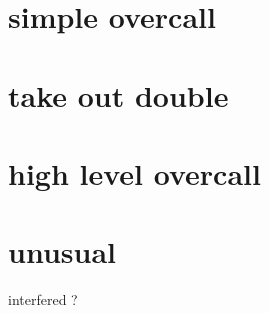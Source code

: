 \section{simple overcall}


\section{take out double}


\section{high level overcall}


\section{unusual}

interfered ?


